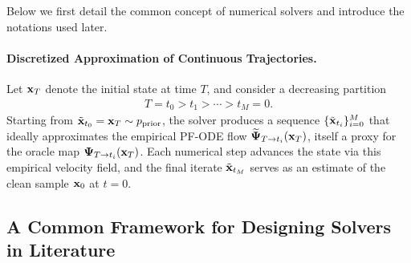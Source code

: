 Below we first detail the common concept of numerical solvers and introduce the notations used later.  

\paragraph{Discretized Approximation of Continuous Trajectories.}  
Let ${\mathbf{x}}_T$ denote the initial state at time $T$, and consider a decreasing partition
\begin{align}\label{eq:time-step-def}
    T = t_0 > t_1 > \cdots > t_M = 0.
\end{align}
Starting from $\tilde{{\mathbf{x}}}_{t_0} = {\mathbf{x}}_T \sim p_{\mathrm{prior}}$, the solver produces a sequence $\{\tilde{{\mathbf{x}}}_{t_i}\}_{i=0}^M$ that ideally approximates the empirical PF-ODE flow $\widetilde{{\bm{\Psi}}}_{T\to t_i}({\mathbf{x}}_T)$, itself a proxy for the oracle map ${\bm{\Psi}}_{T\to t_i}({\mathbf{x}}_T)$. Each numerical step advances the state via this empirical velocity field, and the final iterate $\tilde{{\mathbf{x}}}_{t_M}$ serves as an estimate of the clean sample ${\mathbf{x}}_0$ at $t=0$.






\subsection{A Common Framework for Designing Solvers in Literature}\label{subsec:common_design_solvers}

